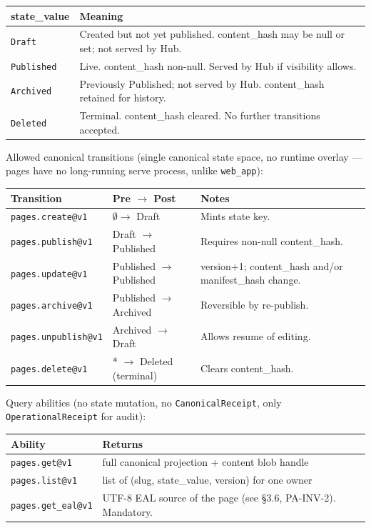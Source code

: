 \documentclass[11pt,a4paper]{article}
\theoremstyle{definition}
\begin{document}
\begin{center}
\renewcommand{\arraystretch}{1.25}
\begin{tabularx}{\linewidth}{l X}
\toprule
\textbf{state\_value} & \textbf{Meaning} \\
\midrule
\texttt{Draft}       & Created but not yet published. content\_hash may be null or set; not served by Hub. \\
\texttt{Published}   & Live. content\_hash non-null. Served by Hub if visibility allows. \\
\texttt{Archived}    & Previously Published; not served by Hub. content\_hash retained for history. \\
\texttt{Deleted}     & Terminal. content\_hash cleared. No further transitions accepted. \\
\bottomrule
\end{tabularx}
\end{center}

\noindent Allowed canonical transitions (single canonical state
space, no runtime overlay --- pages have no long-running serve
process, unlike \texttt{web\_app}):

\begin{center}
\renewcommand{\arraystretch}{1.2}
\begin{tabularx}{\linewidth}{l l X}
\toprule
\textbf{Transition} & \textbf{Pre $\to$ Post} & \textbf{Notes} \\
\midrule
\texttt{pages.create@v1}   & $\emptyset \to$ Draft     & Mints state key. \\
\texttt{pages.publish@v1}  & Draft $\to$ Published     & Requires non-null content\_hash. \\
\texttt{pages.update@v1}   & Published $\to$ Published & version+1; content\_hash and/or manifest\_hash change. \\
\texttt{pages.archive@v1}  & Published $\to$ Archived  & Reversible by re-publish. \\
\texttt{pages.unpublish@v1}& Archived $\to$ Draft      & Allows resume of editing. \\
\texttt{pages.delete@v1}   & * $\to$ Deleted (terminal)& Clears content\_hash. \\
\bottomrule
\end{tabularx}
\end{center}

\noindent Query abilities (no state mutation, no
\texttt{CanonicalReceipt}, only \texttt{OperationalReceipt} for
audit):

\begin{center}
\renewcommand{\arraystretch}{1.2}
\begin{tabularx}{\linewidth}{l l}
\toprule
\textbf{Ability} & \textbf{Returns} \\
\midrule
\texttt{pages.get@v1}     & full canonical projection + content blob handle \\
\texttt{pages.list@v1}    & list of (slug, state\_value, version) for one owner \\
\texttt{pages.get\_eal@v1}& UTF-8 EAL source of the page (see §3.6, PA-INV-2). Mandatory. \\
\bottomrule
\end{tabularx}
\end{center}
\end{document}
